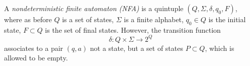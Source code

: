 

\setcounter{section}{1}
\setcounter{subsection}{3}
\setcounter{dfn}{6}

\begin{dfn}
A \emph{nondeterministic finite automaton (NFA)} is a quintuple $(Q, \Sigma, \delta, q_0, F)$, where as before
$Q$ is a set of states, $\Sigma$ is a finite alphabet, $q_0 \in Q$ is the initial state, $F \subset Q$ is the set of final states.
However, the transition function
\[
\delta \colon Q \times \Sigma \to 2^Q
\]
associates to a pair $(q,a)$ not a state, but a set of states $P \subset Q$, which is allowed to be empty.
\end{dfn}


